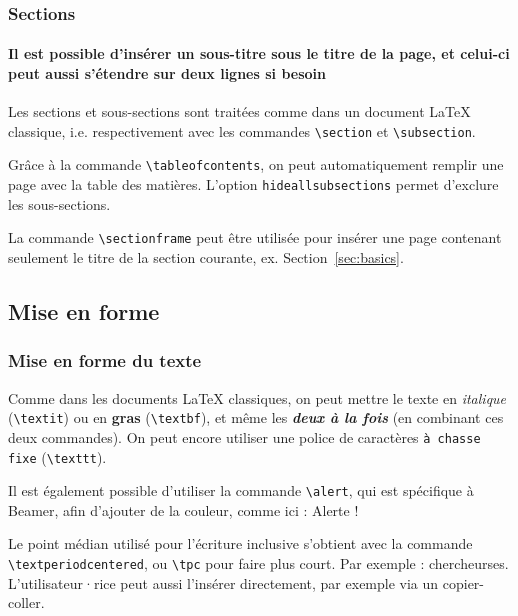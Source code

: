 \documentclass[10pt,    %
    french,             %
    xcolor=table,       %
    envcountsect        %
]{beamer}
\begin{document}
\begin{frame}
    \frametitle{Sections} 
    \framesubtitle{Il est possible d'insérer un sous-titre sous le titre de la page, et celui-ci peut aussi s'étendre sur deux lignes si besoin}
    
    Les sections et sous-sections sont traitées comme dans un document \LaTeX{} classique, i.e. respectivement avec les commandes \texttt{\textbackslash{}section} et \texttt{\textbackslash{}subsection}.
    
    \vspace{0.25cm}
    Grâce à la commande \texttt{\textbackslash{}tableofcontents}, on peut automatiquement remplir une page avec la table des matières. L'option \texttt{hideallsubsections} permet d'exclure les sous-sections.
    
    \vspace{0.25cm}
    La commande \texttt{\textbackslash{}sectionframe} peut être utilisée pour insérer une page contenant seulement le titre de la section courante, ex. Section~\ref{sec:basics}.
\end{frame}




\subsection{Mise en forme}
\begin{frame}
    \frametitle{Mise en forme du texte}
    
    Comme dans les documents \LaTeX{} classiques, on peut mettre le texte en \textit{italique} (\texttt{\textbackslash{}textit}) ou en \textbf{gras} (\texttt{\textbackslash{}textbf}), et même les \textit{\textbf{deux à la fois}} (en combinant ces deux commandes). On peut encore utiliser une police de caractères \texttt{à chasse fixe} (\texttt{\textbackslash{}texttt}).
    
    \vspace{0.25cm}
    Il est également possible d'utiliser la commande \texttt{\textbackslash{}alert}, qui est spécifique à Beamer, afin d'ajouter de la couleur, comme ici : \alert{Alerte !}
    
    \vspace{0.25cm}
    Le point médian utilisé pour l'écriture inclusive s'obtient avec la commande \texttt{\textbackslash{}textperiodcentered}, ou \texttt{\textbackslash{}tpc} pour faire plus court. Par exemple : chercheur\textperiodcentered{}se\tpc{}s. L'utilisateur·rice peut aussi l'insérer directement, par exemple via un copier-coller.
\end{frame}
    
\end{document}
